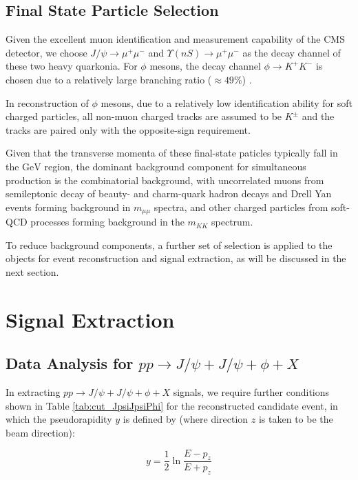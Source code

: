 \documentclass[10pt,twocolumn]{article}
\begin{document}
\subsection{Final State Particle Selection}

Given the excellent muon identification and measurement capability of the CMS detector,  we choose $J/\psi\to\mu^+\mu^-$ and $\Upsilon(nS)\to\mu^+\mu^-$ as the decay channel of these two heavy quarkonia. For $\phi$ mesons, the decay channel $\phi\to K^+K^-$ is chosen due to a relatively large branching ratio ($\approx 49\%$) \cite{PDG2020}.

In reconstruction of $\phi$ mesons, due to a relatively low identification ability for soft charged particles, all non-muon charged tracks are assumed to be $K^\pm $ and the tracks are paired only with the opposite-sign requirement.

Given that the transverse momenta of these final-state paticles typically fall in the $\text{GeV}$ region, the dominant background component for simultaneous production is the combinatorial background, with uncorrelated muons from semileptonic decay of beauty- and charm-quark hadron decays and Drell Yan events forming background in $m_{\mu\mu}$ spectra, and other charged particles from soft-QCD processes forming background in the $m_{KK}$ spectrum\cite{CMS_TRI_JPSI}.

To reduce background components, a further set of selection is applied to the objects for event reconstruction and signal extraction, as will be discussed in the next section.

\section{Signal Extraction}

\subsection{Data Analysis for $pp\to J/\psi+J/\psi+\phi+X$}

In extracting $pp\to J/\psi+J/\psi+\phi+X$ signals, we require further conditions shown in Table \ref{tab:cut_JpsiJpsiPhi} for the reconstructed candidate event, in which the pseudorapidity $y$ is defined by (where direction $z$ is taken to be the beam direction):

\begin{equation}
    y = \frac{1}{2} \ln \frac {E-p_z}{E+p_z}
\end{equation}
\end{document}
